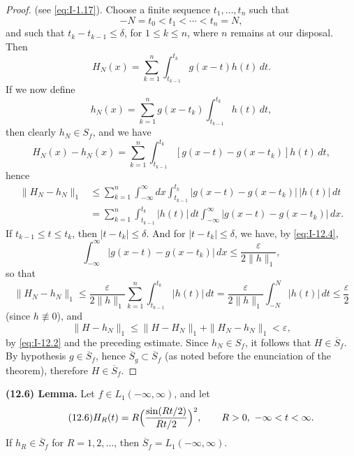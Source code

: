 \begin{proof}
(see \eqref{eq:I-1.17}). Choose a finite sequence $t_1,\ldots,t_n$ such that
\begin{equation*}
-N=t_0<t_1<\cdots<t_n=N,
\end{equation*}
and such that $t_k-t_{k-1}\le\delta$, for $1\le k\le n$, where $n$ remains at our disposal. Then
\begin{equation*}
H_N(x)=\sum_{k=1}^{n}\int_{t_{k-1}}^{t_k}g(x-t)h(t)\,dt.
\end{equation*}
If we now define
\begin{equation*}
h_N(x)=\sum_{k=1}^{n}g(x-t_k)\int_{t_{k-1}}^{t_k}h(t)\,dt,
\end{equation*}
then clearly $h_N\in S_f$, and we have
\begin{equation*}
H_N(x)-h_N(x)=\sum_{k=1}^{n}\int_{t_{k-1}}^{t_k}[g(x-t)-g(x-t_k)]h(t)\,dt,
\end{equation*}
hence
\begin{equation*}
\begin{aligned}
\|H_N-h_N\|_1 &\le \sum_{k=1}^{n}\int_{-\infty}^{\infty}dx\int_{t_{k-1}}^{t_k}|g(x-t)-g(x-t_k)|\,|h(t)|\,dt\\
&= \sum_{k=1}^{n}\int_{t_{k-1}}^{t_k}|h(t)|\,dt\int_{-\infty}^{\infty}|g(x-t)-g(x-t_k)|\,dx.
\end{aligned}
\end{equation*}
If $t_{k-1}\le t\le t_k$, then $|t-t_k|\le\delta$. And for $|t-t_k|\le\delta$, we have, by \eqref{eq:I-12.4},
\begin{equation*}
\int_{-\infty}^{\infty}|g(x-t)-g(x-t_k)|\,dx\le\frac{\varepsilon}{2\|h\|_1},
\end{equation*}
so that
\begin{equation*}
\|H_N-h_N\|_1\le\frac{\varepsilon}{2\|h\|_1}\sum_{k=1}^{n}\int_{t_{k-1}}^{t_k}|h(t)|\,dt=\frac{\varepsilon}{2\|h\|_1}\int_{-N}^{N}|h(t)|\,dt\le\frac{\varepsilon}{2}
\end{equation*}
(since $h\not\equiv 0$), and
\begin{equation*}
\|H-h_N\|_1\le\|H-H_N\|_1+\|H_N-h_N\|_1<\varepsilon,
\end{equation*}
by \eqref{eq:I-12.2} and the preceding estimate. Since $h_N\in S_f$, it follows that $H\in\overline S_f$. By hypothesis $g\in\overline S_f$, hence $\overline S_g\subset\overline S_f$ (as noted before the enunciation of the theorem), therefore $H\in\overline S_f$.
\end{proof}

\noindent\textbf{(12.6) Lemma.}
Let $f\in L_1(-\infty,\infty)$, and let
\begin{equation}\tag{12.6}\label{eq:I-12.6}
H_R(t)=R\Bigl(\frac{\sin(Rt/2)}{Rt/2}\Bigr)^2,\qquad R>0,\ -\infty<t<\infty.
\end{equation}
If $h_R\in\overline S_f$ for $R=1,2,\ldots$, then $\overline S_f=L_1(-\infty,\infty)$.

